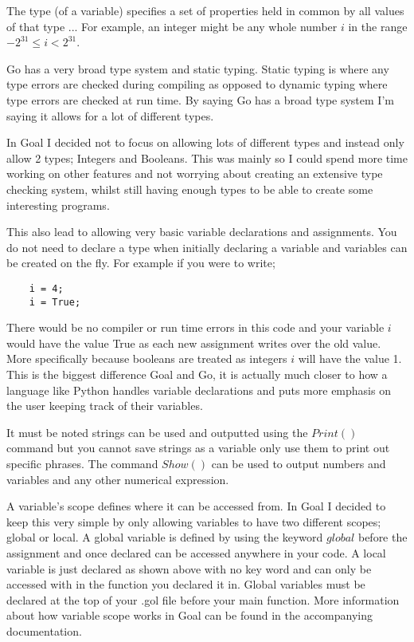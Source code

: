 \begin{displayquote}
The type (of a variable) specifies a set of properties held in common by all values of that type ... For example, an integer might be any whole number $i$ in the range $-2^{31} \leq i < 2^{31}$.
\end{displayquote}

Go has a very broad type system and static typing. Static typing is where any type errors are checked during compiling as opposed to dynamic typing where type errors are checked at run time. By saying Go has a broad type system I'm saying it allows for a lot of different types.

In Goal I decided not to focus on allowing lots of different types and instead only allow 2 types; Integers and Booleans. This was mainly so I could spend more time working on other features and not worrying about creating an extensive type checking system, whilst still having enough types to be able to create some interesting programs.

This also lead to allowing very basic variable declarations and assignments. You do not need to declare a type when initially declaring a variable and variables can be created on the fly. For example if you were to write;

\begin{lstlisting}
	i = 4;
	i = True;
\end{lstlisting}

There would be no compiler or run time errors in this code and your variable $i$ would have the value True as each new assignment writes over the old value. More specifically because booleans are treated as integers $i$ will have the value 1.  This is the biggest difference Goal and Go, it is actually much closer to how a language like Python handles variable declarations and puts more emphasis on the user keeping track of their variables.

It must be noted strings can be used and outputted using the $Print()$ command but you cannot save strings as a variable only use them to print out specific phrases. The command $Show()$ can be used to output numbers and variables and any other numerical expression. 

A variable's scope defines where it can be accessed from. In Goal I decided to keep this very simple by only allowing variables to have two different scopes; global or local. A global variable is defined by using the keyword $global$ before the assignment and once declared can be accessed anywhere in your code. A local variable is just declared as shown above with no key word and can only be accessed with in the function you declared it in. Global variables must be declared at the top of your .gol file before your main function. More information about how variable scope works in Goal can be found in the accompanying documentation.     


